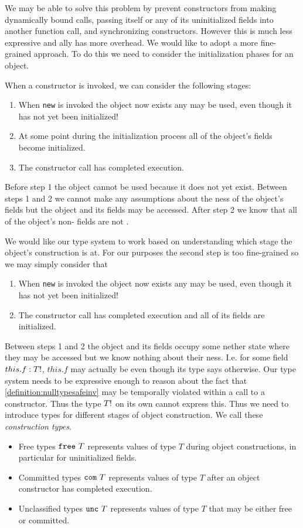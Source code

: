 \documentclass{article}
\begin{document}
We may be able to solve this problem by prevent constructors from making dynamically bound calls, passing itself or any of its uninitialized fields into another function call, and synchronizing constructors.
However this is much less expressive and \dynamic{}ally has more overhead.
We would like to adopt a more fine-grained approach.
To do this we need to consider the initialization phases for an object.

When a constructor is invoked, we can consider the following stages:
\begin{enumerate}
\item When \texttt{new} is invoked the object now exists any may be used, even though it has not yet been initialized!
\item At some point during the initialization process all of the object's fields become initialized.
\item The constructor call has completed execution.
\end{enumerate}

Before step 1 the object cannot be used because it does not yet exist.
Between steps 1 and 2 we cannot make any assumptions about the \cringe{}ness of the object's fields but the object and its fields may be accessed.
After step 2 we know that all of the object's non-\cringe{} fields are not \cringe{}.

We would like our type system to work based on understanding which stage the object's construction is at.
For our purposes the second step is too fine-grained so we may simply consider that

\begin{enumerate}
\item When \texttt{new} is invoked the object now exists any may be used, even though it has not yet been initialized!
\item The constructor call has completed execution and all of its fields are initialized.
\end{enumerate}

Between steps 1 and 2 the object and its fields occupy some nether state where they may be accessed but we know nothing about their \cringe{}ness.
I.e. for some field $this.f : T !$, $this.f$ may actually be \cringe{} even though its type says otherwise.
Our type system needs to be expressive enough to reason about the fact that \ref{definition:nulltypesafeinv} may be temporally violated within a call to a constructor.
Thus the type $T !$ on its own cannot express this.
Thus we need to introduce types for different stages of object construction.
We call these \textit{construction types}.
\begin{itemize}
\item Free types $\texttt{free} ~ T$ represents values of type $T$ during object constructions, in particular for uninitialized fields.
\item Committed types $\texttt{com} ~ T$ represents values of type $T$ after an object constructor has completed execution.
\item Unclassified types $\texttt{unc} ~ T$ represents values of type $T$ that may be either free or committed.
\end{itemize}
\end{document}
